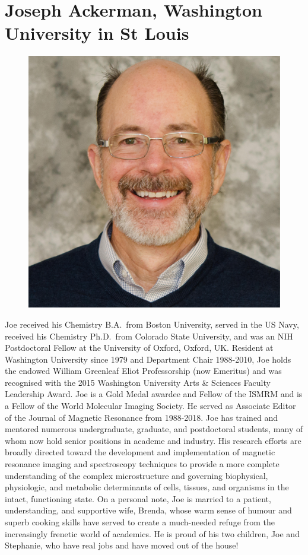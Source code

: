\documentclass[a5paper,10pt,twoside,onecolumn,openany,helvetica,showtrims]{memoir}
\newlength{\SpeakerSize}
\begin{document}
\section*{Joseph Ackerman, Washington University in St Louis}
\begin{figure}
\includegraphics[width=\SpeakerSize]{SpeakerPics/image8}	
\end{figure}
Joe received his Chemistry B.A.~from Boston University, served in the US Navy, received his Chemistry Ph.D.~from Colorado State University, and was an NIH Postdoctoral Fellow at the University of Oxford, Oxford, UK. Resident at Washington University since 1979 and Department Chair 1988-2010, Joe holds the endowed William Greenleaf Eliot Professorship (now Emeritus) and was recognised with the 2015 Washington University Arts \& Sciences Faculty Leadership Award. Joe is a Gold Medal awardee and Fellow of the ISMRM and is a Fellow of the World Molecular Imaging Society. He served as Associate Editor of the Journal of Magnetic Resonance from 1988-2018. Joe has trained and mentored numerous undergraduate, graduate, and postdoctoral students, many of whom now hold senior positions in academe and industry. His research efforts are broadly directed toward the development and implementation of magnetic resonance imaging and spectroscopy techniques to provide a more complete understanding of the complex microstructure and governing biophysical, physiologic, and metabolic determinants of cells, tissues, and organisms in the intact, functioning state. On a personal note, Joe is married to a patient, understanding, and supportive wife, Brenda, whose warm sense of humour and superb cooking skills have served to create a much-needed refuge from the increasingly frenetic world of academics. He is proud of his two children, Joe and Stephanie, who have real jobs and have moved out of the house!
\end{document}
